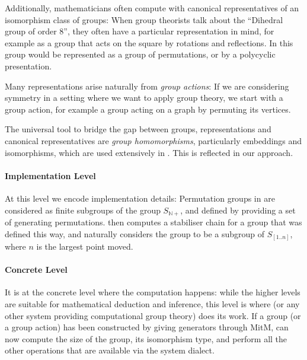 Additionally, mathematicians often compute with canonical representatives of an isomorphism class of groups: When group theorists talk about the ``Dihedral group of order 8'', they often have a particular representation in mind, for example as a group that acts on the square by rotations and reflections.
In \GAP this group would be represented as a group of permutations, or by a polycyclic presentation.

Many representations arise naturally from \emph{group actions}: If we are considering symmetry in a setting where we want to apply group theory, we start with a group action, for example a group acting on a graph by permuting its vertices.

The universal tool to bridge the gap between groups, representations and canonical representatives are \emph{group homomorphisms}, particularly embeddings and isomorphisms, which are used extensively in \GAP.
This is reflected in our approach.

\paragraph{Implementation Level}
At this level we encode implementation details: Permutation groups in \GAP are considered as finite subgroups of the group $S_{\mathbb{N}+}$, and defined by providing a set of generating permutations.
\GAP then computes a stabiliser chain for a group that was defined this way, and naturally considers the group to be a subgroup of $S_{[1..n]}$, where $n$ is the largest point moved.

\paragraph{Concrete Level}
It is at the concrete level where the computation happens: while the higher levels are suitable for mathematical deduction and inference, this level is where \GAP (or any other system providing computational group theory) does its work.
If a group (or a group action) has been constructed by giving generators through MitM, \GAP can now compute the size of the group, its isomorphism type, and perform all the other operations that are available via the \GAP system dialect.

